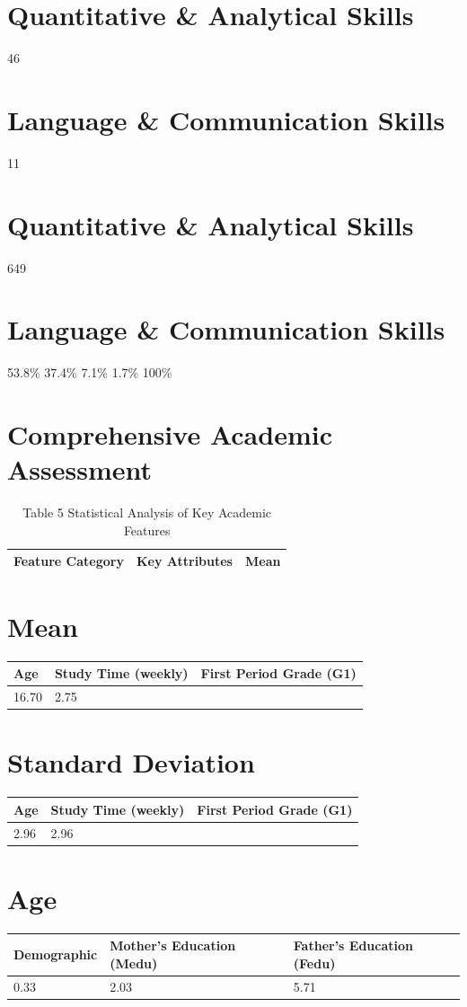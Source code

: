 \documentclass[twocolumn]{svjour3}
\begin{document}
\section{Quantitative \& Analytical Skills}
46
\section{Language \& Communication Skills}
11
\section{Quantitative \& Analytical Skills}
649
\section{Language \& Communication Skills}
53.8\%
37.4\%
7.1\%
1.7\%
100\%
\section{Comprehensive Academic Assessment}
\begin{table}
\centering
\caption{Table 5 Statistical Analysis of Key Academic Features}
\begin{tabular}{lll}
\hline
Feature Category & Key Attributes & Mean \\
\hline
\end{tabular}
\end{table}

\section{Mean}
\begin{tabular}{lll}
\hline
Age & Study Time (weekly) & First Period Grade (G1) \\
\hline
16.70 & 2.75 & \\
\hline
\end{tabular}
\section{Standard Deviation}
\begin{tabular}{lll}
\hline
Age & Study Time (weekly) & First Period Grade (G1) \\
\hline
2.96 & 2.96 & \\
\hline
\end{tabular}
\section{Age}
\begin{tabular}{lll}
\hline
Demographic & Mother's Education (Medu) & Father's Education (Fedu) \\
\hline
0.33 & 2.03 & 5.71 \\
\hline
\end{tabular}
\end{document}
